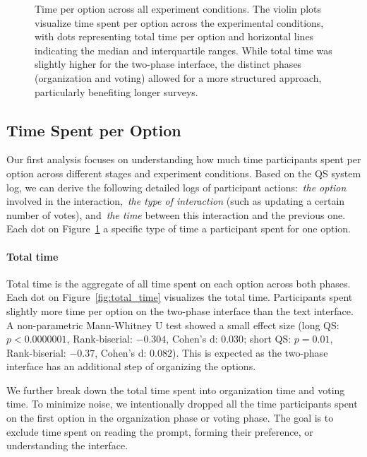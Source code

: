\begin{figure}[htbp]
{\begin{minipage}{\wd\savefig}
            \usebox{\savefig}
             \captionsetup{width=0.67\pdfpageheight}
            \caption{Time per option across all experiment conditions. The violin plots visualize time spent per option across the experimental conditions, with dots representing total time per option and horizontal lines indicating the median and interquartile ranges. While total time was slightly higher for the two-phase interface, the distinct phases (organization and voting) allowed for a more structured approach, particularly benefiting longer surveys.}
            \label{fig:time_per_option_full}
        \end{minipage}
    }
\end{figure}


\subsection{Time Spent per Option}
\label{sec:time_per_option}
Our first analysis focuses on understanding how much time participants spent per option across different stages and experiment conditions. Based on the QS system log, we can derive the following detailed logs of participant actions:~\textit{the option}  involved in the interaction,~\textit{the type of interaction} (such as updating a certain number of votes), and~\textit{the time} between this interaction and the previous one. Each dot on Figure~\ref{fig:time_per_option_full} a specific type of time a participant spent for one option. 

\paragraph{Total time} Total time is the aggregate of all time spent on each option across both phases. Each dot on Figure~\ref{fig:total_time} visualizes the total time. Participants spent slightly more time per option on the two-phase interface than the text interface. A non-parametric Mann-Whitney U test showed a small effect size (long QS: $p<0.0000001$, Rank-biserial: $-0.304$, Cohen's d: $0.030$; short QS: $p=0.01$, Rank-biserial: $-0.37$, Cohen's d: $0.082$). This is expected as the two-phase interface has an additional step of organizing the options. 

We further break down the total time spent into organization time and voting time. To minimize noise, we intentionally dropped all the time participants spent on the first option in the organization phase or voting phase. The goal is to exclude time spent on reading the prompt, forming their preference, or understanding the interface.


